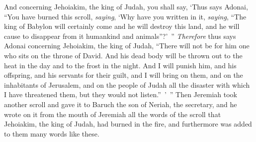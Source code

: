 \begin{biblechapter}
\verse And concerning Jehoiakim, the king of Judah, you shall say, ‘Thus says Adonai, “You have burned this scroll, \textit{saying}, ‘Why have you written in it, \textit{saying}, “The king of Babylon will certainly come and he will destroy this land, and he will cause to disappear from it humankind and animals”?’ ”
\verse \textit{Therefore} thus says Adonai concerning Jehoiakim, the king of Judah, “There will not be for him one who sits on the throne of David. And his dead body will be thrown out to the heat in the day and to the frost in the night.
\verse And I will punish him, and his offspring, and his servants for their guilt, and I will bring on them, and on the inhabitants of Jerusalem, and on the people of Judah all the disaster with which I have threatened them, but they would not listen.” ’ ”
\verse Then Jeremiah took another scroll and gave it to Baruch the son of Neriah, the secretary, and he wrote on it from the mouth of Jeremiah all the words of the scroll that Jehoiakim, the king of Judah, had burned in the fire, and furthermore was added to them many words like these.
\end{biblechapter}

